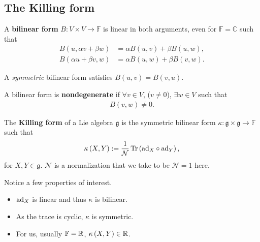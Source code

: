 
\subsection{The Killing form}


\begin{definition}
    A \textbf{bilinear form} $B : V \times V \to \mathbb{F}$ is linear in both arguments, even for $\mathbb{F} = \mathbb{C}$ such that
    \begin{align}
        B \left( u, \alpha v + \beta w \right) &= \alpha B \left( u,v \right) + \beta B \left( u,w \right), \\
        B \left( \alpha u + \beta v, w \right) &= \alpha B \left( u, w \right) + \beta B\left( v,w \right) 
    .\end{align}
\end{definition}

A \emph{symmetric} bilinear form satisfies $B \left( u,v \right) = B\left( v,u \right) $.

\begin{definition}
    A bilinear form is \textbf{nondegenerate} if $\forall v \in V$, ($v \neq 0$), $\exists w \in V$ such that
    \begin{align}
        B \left( v,w \right) \neq 0
    .\end{align}
\end{definition}

\begin{definition}
    The \textbf{Killing form} of a Lie algebra $\mathfrak{g}$ is the symmetric bilinear form $\kappa : \mathfrak{g} \times  \mathfrak{g} \to \mathbb{F}$ such that
    \begin{align}
        \kappa \left( X,Y \right) := \frac{1}{\mathcal{N}} \Tr \left( \text{ad}_X \circ \text{ad}_Y \right) 
    ,\end{align}
    for $X,Y \in \mathfrak{g}$. $\mathcal{N}$ is a normalization that we take to be $\mathcal{N} = 1$ here.
\end{definition}

Notice a few properties of interest.
\begin{itemize}
    \item $\text{ad}_X$ is linear and thus $\kappa$ is bilinear.
    \item As the trace is cyclic, $\kappa$ is symmetric.
    \item For us, usually $\mathbb{F} = \mathbb{R}$, $\kappa \left( X,Y \right)  \in \mathbb{R}$.
\end{itemize}

